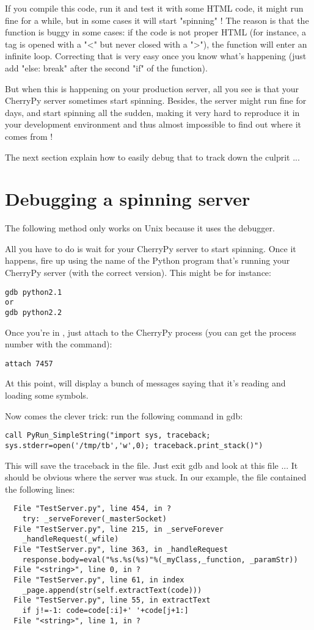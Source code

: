 \documentclass{manual}
\begin{document}
If you compile this code, run it and test it with some HTML code, it might run fine for a while, but in some cases it will
start "spinning" ! The reason is that the  function is buggy in some cases: if the code is not proper
HTML (for instance, a tag is opened with a "<" but never closed with a ">"), the function will enter an infinite loop.
Correcting that is very easy once you know what's happening (just add "else: break" after the second "if" of
the function).

But when this is happening on your production server, all you see is that your CherryPy server sometimes start spinning.
Besides, the server might run fine for days, and start spinning all the sudden, making it very hard to reproduce it
in your development environment and thus almost impossible to find out where it comes from !


The next section explain how to easily debug that to track down the culprit ...

\section{Debugging a spinning server}
The following method only works on Unix because it uses the  debugger.

All you have to do is wait for your CherryPy server to start spinning. Once it happens, fire up  using the
name of the Python program that's running your CherryPy server (with the correct version). This might be for instance:
\begin{verbatim}
gdb python2.1
or
gdb python2.2
\end{verbatim}
Once you're in , just attach to the CherryPy process (you can get the process number with the  command):
\begin{verbatim}
attach 7457
\end{verbatim}
At this point,  will display a bunch of messages saying that it's reading and loading some symbols.

Now comes the clever trick: run the following command in gdb:
\begin{verbatim}
call PyRun_SimpleString("import sys, traceback; sys.stderr=open('/tmp/tb','w',0); traceback.print_stack()")
\end{verbatim}

This will save the traceback in the  file. Just exit gdb and look at this file ... It should be obvious where
the server was stuck. In our example, the file contained the following lines:
\begin{verbatim}
  File "TestServer.py", line 454, in ?
    try: _serveForever(_masterSocket)
  File "TestServer.py", line 215, in _serveForever
    _handleRequest(_wfile)
  File "TestServer.py", line 363, in _handleRequest
    response.body=eval("%s.%s(%s)"%(_myClass,_function, _paramStr))
  File "<string>", line 0, in ?
  File "TestServer.py", line 61, in index
    _page.append(str(self.extractText(code)))
  File "TestServer.py", line 55, in extractText
    if j!=-1: code=code[:i]+' '+code[j+1:]
  File "<string>", line 1, in ?
\end{verbatim}
\end{document}
